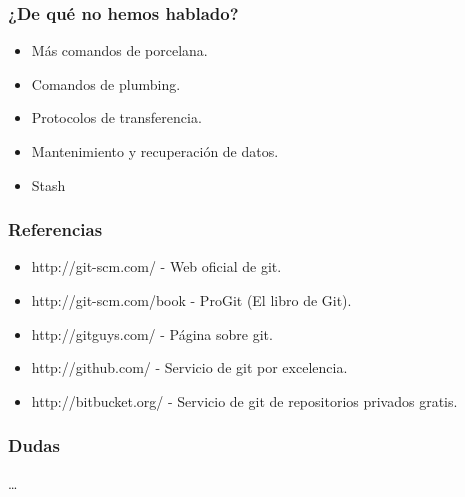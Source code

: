 \documentclass[10pt]{beamer}
\begin{document}
  \begin{frame}
    \frametitle{¿De qué no hemos hablado?}
    \begin{itemize}
        \item Más comandos de porcelana.
        \item Comandos de plumbing.
        \item Protocolos de transferencia.
        \item Mantenimiento y recuperación de datos.
        \item Stash
    \end{itemize}
  \end{frame}

  \begin{frame}
    \frametitle{Referencias}
    \begin{itemize}
      \item \small{http://git-scm.com/ - Web oficial de git.}
      \item \small{http://git-scm.com/book - ProGit (El libro de Git).}
      \item \small{http://gitguys.com/ - Página sobre git.}
      \item \small{http://github.com/ - Servicio de git por excelencia.}
      \item \small{http://bitbucket.org/ - Servicio de git de repositorios privados gratis.}
    \end{itemize}
  \end{frame}

  \begin{frame}
    \frametitle{Dudas}
    \dots
  \end{frame}
\end{document}
